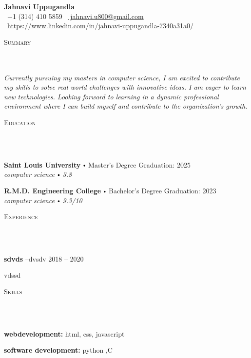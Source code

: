 \documentclass{article}
\newcommand{\school}[4]{
        \textbf{#1} \labelitemi #2 \hfill #3 \\ #4 \vspace*{5pt}
      }
\newcommand{\employer}[4]{{
        \vspace*{2pt}%
        \textbf{#1} #2 \hfill #3\\ #4 \vspace*{2pt}}
        }
\newcommand{\lineunder}{
        \vspace*{-8pt} \\ \hspace*{-18pt} 
        \hrulefill \\
        }
\newcommand{\header}[1]{{
        \hspace*{-15pt}\vspace*{6pt} \textsc{#1}} \vspace*{-6pt} 
        \lineunder
        }
\renewcommand{\labelitemi}{
        $\vcenter{\hbox{\tiny$\bullet$}}$\hspace*{3pt}
        }
\renewcommand{\labelitemii}{
        $\vcenter{\hbox{\tiny$\bullet$}}$\hspace*{-3pt}
        }
\newenvironment{bullet-list-major}{
          \begin{list}{\labelitemii}{\setlength\leftmargin{3pt} 
          \topsep 0pt \itemsep -2pt}}{\vspace*{4pt}\end{list}
          }
\newenvironment{bullet-list-minor}{
          \begin{list}{\labelitemii}{\setlength\leftmargin{15pt} 
            \topsep 0pt \itemsep -2pt}}{\vspace*{4pt}\end{list}
            }
\begin{document}
  
      \small
      \smallskip
      \vspace*{-44pt}
  
      \begin{center}
        {\LARGE \textbf{Jahnavi Uppugandla}} \\
        \faPhone\ +1 (314) 410 5859 \quad
        \faEnvelope\ \href{mailto:  jahnavi.u800@gmail.com}{  jahnavi.u800@gmail.com} \quad
        \faLinkedin\ \url{https://www.linkedin.com/in/jahnavi-uppugandla-7340a31a0/}
      \end{center}
     \vspace*{4pt}%
      \header{Summary}
  
      {
        \textit{Currently pursuing my masters in computer science, I am excited to contribute my skills to solve real world
challenges with innovative ideas. I am eager to learn new technologies. Looking forward to learning in a
dynamic professional environment where I can build myself and contribute to the organization's growth.}
        }
  
      \vspace{15pt}
  
     \header{Education}
  
      {
        \school{Saint Louis University}{Master's Degree}{Graduation: 2025}{\textit{computer science \labelitemi 3.8}}
        

        \school{R.M.D. Engineering College}{Bachelor's Degree}{Graduation: 2023}{\textit{computer science \labelitemi 9.3/10}}
        }
  
      \vspace*{4pt}%
      \header{Experience}
  
      {
            \employer{sdvds}{--dvsdv}{2018 -- 2020}{}
            \begin{bullet-list-minor}
                \item vdssd
            \end{bullet-list-minor}
          }
      \vspace*{4pt}%

      \header{Skills}
      {
        \begin{bullet-list-major}
        \item \textbf{webdevelopment:} html, css, javascript
        \end{bullet-list-major}
        

        \begin{bullet-list-major}
        \item \textbf{software development:} python ,C
        \end{bullet-list-major}
        }
  
\end{document}
